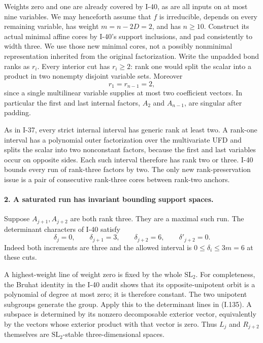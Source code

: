 Weights zero and one are already covered by I-40, as are all
inputs on at most nine variables. We may henceforth assume
that $f$ is irreducible, depends on every remaining variable,
has weight $m=n-2D=2$, and has $n\ge10$. Construct its actual
minimal affine cores by I-40's support inclusions, and pad
consistently to width three. We use those new minimal cores,
not a possibly nonminimal representation inherited from the
original factorization. Write the unpadded bond ranks as $r_i$.
Every interior cut has $r_i\ge2$: rank one would split the
scalar into a product in two nonempty disjoint variable sets.
Moreover
\[
 r_1=r_{n-1}=2,
 \tag{I.134}
\]
since a single multilinear variable supplies at most two
coefficient vectors. In particular the first and last internal
factors, $A_2$ and $A_{n-1}$, are singular after padding.

As in I-37, every strict internal interval has generic rank at
least two. A rank-one interval has a polynomial outer
factorization over the multivariate UFD and splits the scalar
into two nonconstant factors, because the first and last
variables occur on opposite sides. Each such interval therefore
has rank two or three. I-40 bounds every run of rank-three
factors by two. The only new rank-preservation issue is a pair
of consecutive rank-three cores between rank-two anchors.

\paragraph{2. A saturated run has invariant bounding support spaces.}
Suppose $A_{j+1},A_{j+2}$ are both rank three. They are a
maximal such run. The determinant characters of I-40 satisfy
\[
 \delta_j=0,\qquad \delta_{j+1}=3,
 \qquad\delta_{j+2}=6,
 \qquad\delta'_{j+2}=0.
 \tag{I.135}
\]
Indeed both increments are three and the allowed interval is
$0\le\delta_i\le3m=6$ at these cuts.

A highest-weight line of weight zero is fixed by the whole
$\mathrm{SL}_2$. For completeness, the Bruhat identity in the
I-40 audit shows that its opposite-unipotent orbit is a
polynomial of degree at most zero; it is therefore constant.
The two unipotent subgroups generate the group. Apply this to
the determinant lines in (I.135). A subspace is determined by
its nonzero decomposable exterior vector, equivalently by the
vectors whose exterior product with that vector is zero.
Thus $L_j$ and $R_{j+2}$ themselves are $\mathrm{SL}_2$-stable
three-dimensional spaces.

